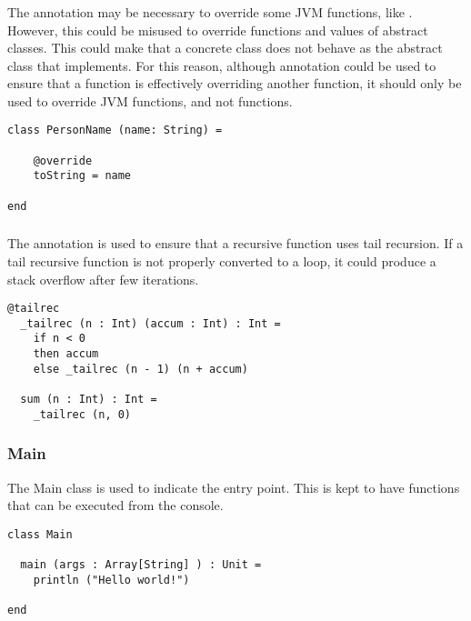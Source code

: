\subsubsection{\sodaoverride}

The \sodaoverride annotation may be necessary to override some JVM functions, like .
However, this could be misused to override functions and values of abstract classes.
This could make that a concrete class does not behave as the abstract class that implements.
For this reason, although \sodaoverride annotation could be used to ensure that a function is effectively overriding another function, it should only be used to override JVM functions, and not \Soda functions.

\begin{lstlisting}[label={lst:exampleOverride}]
class PersonName (name: String) =

    @override
    toString = name

end
\end{lstlisting}

\subsubsection{\sodatailrec}

The \sodatailrec annotation is used to ensure that a recursive function uses tail recursion.
If a tail recursive function is not properly converted to a loop, it could produce a stack overflow after few iterations.

\begin{lstlisting}[label={lst:exampleTailrecInside}]
  @tailrec
  _tailrec (n : Int) (accum : Int) : Int =
    if n < 0
    then accum
    else _tailrec (n - 1) (n + accum)

  sum (n : Int) : Int =
    _tailrec (n, 0)
\end{lstlisting}

\subsubsection{Main}

The Main class is used to indicate the entry point.
This is kept to have functions that can be executed from the console.

\begin{lstlisting}[label={lst:exampleMain}]
class Main

  main (args : Array[String] ) : Unit =
    println ("Hello world!")

end
\end{lstlisting}

